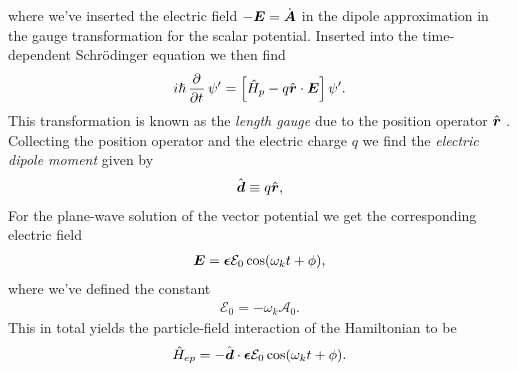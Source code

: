             where we've inserted the electric field $-\boldsymbol{E} = \dot{\boldsymbol{A}}$
            in the dipole approximation in the gauge transformation for the
            scalar potential.
            Inserted into the time-dependent Schrödinger equation we then find
            \begin{align}
                i\hslash\dpd{}{t}\psi'
                = \brak{
                    \hamil_p
                    - q\positionvec\cdot\vfg{E}
                }\psi'.
            \end{align}
            This transformation is known as the \emph{length gauge} due to the
            position operator $\hat{\boldsymbol{r}}$ \cite{joachain2012atoms}.
            Collecting the position operator and the electric charge $q$ we find
            the \emph{electric dipole moment} given by
            \begin{align}
                \hat{\boldsymbol{d}}
                \equiv
                q\hat{\boldsymbol{r}},
                \label{eq:dipole-moment}
            \end{align}
            For the plane-wave solution of the vector potential we get the
            corresponding electric field
            \begin{align}
                \boldsymbol{E}
                = \boldsymbol{\epsilon}\mathcal{E}_0\cos(\omega_k t + \phi),
            \end{align}
            where we've defined the constant
            \begin{align}
                \mathcal{E}_0 = -\omega_k \mathcal{A}_0.
                \label{eq:electric-field-constant}
            \end{align}
            This in total yields the particle-field interaction of the
            Hamiltonian to be
            \begin{align}
                \hat{H}_{ep}
                = -\hat{\boldsymbol{d}}\cdot\boldsymbol{\epsilon}
                \mathcal{E}_0\cos(\omega_k t + \phi).
            \end{align}



